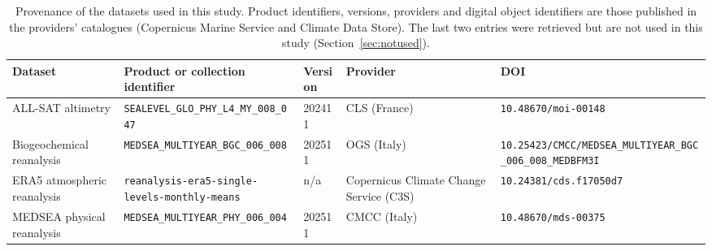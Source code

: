 \begin{table}[htbp]
  \centering
  \footnotesize
  \setlength{\tabcolsep}{4pt}
  \caption{Provenance of the datasets used in this study. Product identifiers, versions, providers and digital object identifiers are those published in the providers' catalogues (Copernicus Marine Service and Climate Data Store). The last two entries were retrieved but are not used in this study (Section~\ref{sec:notused}).}
  \label{tab:datasets-provenance}
  \begin{tabular}{@{}p{2.7cm}p{4.9cm}p{1.2cm}p{2.3cm}p{3.6cm}@{}}
    \toprule
    \raggedright\hspace{0pt}Dataset & \raggedright\hspace{0pt}Product or collection identifier & \raggedright\hspace{0pt}Version & \raggedright\hspace{0pt}Provider & \raggedright\hspace{0pt}DOI \tabularnewline
    \midrule
    \raggedright\hspace{0pt}ALL-SAT altimetry & \raggedright\hspace{0pt}\nolinkurl{SEALEVEL_GLO_PHY_L4_MY_008_047} & \raggedright\hspace{0pt}202411 & \raggedright\hspace{0pt}CLS (France) & \raggedright\hspace{0pt}\nolinkurl{10.48670/moi-00148} \tabularnewline
    \raggedright\hspace{0pt}Biogeochemical reanalysis & \raggedright\hspace{0pt}\nolinkurl{MEDSEA_MULTIYEAR_BGC_006_008} & \raggedright\hspace{0pt}202511 & \raggedright\hspace{0pt}OGS (Italy) & \raggedright\hspace{0pt}\nolinkurl{10.25423/CMCC/MEDSEA_MULTIYEAR_BGC_006_008_MEDBFM3I} \tabularnewline
    \raggedright\hspace{0pt}ERA5 atmospheric reanalysis & \raggedright\hspace{0pt}\nolinkurl{reanalysis-era5-single-levels-monthly-means} & \raggedright\hspace{0pt}n/a & \raggedright\hspace{0pt}Copernicus Climate Change Service (C3S) & \raggedright\hspace{0pt}\nolinkurl{10.24381/cds.f17050d7} \tabularnewline
    \raggedright\hspace{0pt}MEDSEA physical reanalysis & \raggedright\hspace{0pt}\nolinkurl{MEDSEA_MULTIYEAR_PHY_006_004} & \raggedright\hspace{0pt}202511 & \raggedright\hspace{0pt}CMCC (Italy) & \raggedright\hspace{0pt}\nolinkurl{10.48670/mds-00375} \tabularnewline

\end{tabular}
\end{table}
